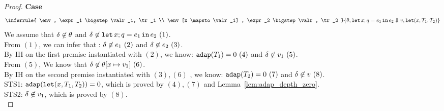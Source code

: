\begin{proof}
%
\textbf{Case}
\[
\inferrule{
  \env, \expr_1 \bigstep \valr_1, \tr_1 \\
  \env[x \mapsto \valr_1] , \expr_2 \bigstep \valr, \tr_2
}
{\env, \elet x;q = \expr_1 \ein \expr_2 \bigstep \valr, \trlet (x,
  \tr_1, \tr_2) }
\]
We assume that $\delta \not\in \theta$ and $\delta \not\in
\mathop{\mathtt{let}} x;q = e_1 \mathop{ \mathtt{in}} e_2 ~(1) $.\\
From $(1)$, we can infer that : $\delta \not\in e_1~(2)$ and $\delta \not\in e_2~(3)$.  \\
By IH on the first premise instantiated with $(2)$, we know:
$\mathtt{adap}(T_1) = 0~(4)$ and $\delta \not\in v_1 ~(5) $. \\
From $(5)$, We know that $ \delta \not\in \theta[x \mapsto
v_1]~(6)$.\\
By IH on the second premise instantiated with $(3),(6)$ , we know:
$\mathtt{adap}(T_2) = 0~(7)$ and $\delta \not\in v~(8)$. \\
STS1: $\mathtt{adap}( \mathop{\mathtt{let}} (x,
  T_1, T_2) ) = 0$, which is proved by $(4),(7)$ and Lemma~\ref{lem:adap_depth_zero}.\\
STS2: $\delta \not\in v_1 $, which is proved by $(8)$. \\

\end{proof}

